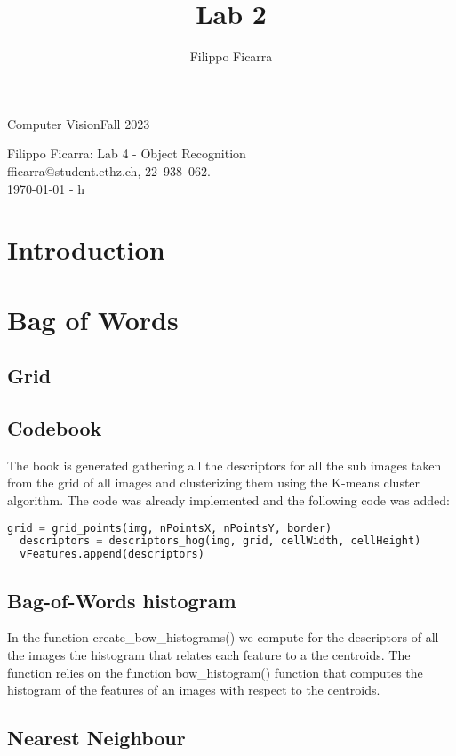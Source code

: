 \documentclass{ETHExercise}
\title{Lab 2}
\author{Filippo Ficarra}
\newcommand{\timestamp}{\ddmmyyyydate\today \,\,- \currenttime h}
\begin{document}
{}
{\Large Computer Vision}{Fall 2023}
\begin{center}
    {\Huge Filippo Ficarra: Lab 4 - Object Recognition}\\
      \quad\newline
      fficarra@student.ethz.ch, 22--938--062.\\
      \quad\newline
      \timestamp
      \end{center}

\section{Introduction}

\section{Bag of Words}
\subsection{Grid}
\subsection{Codebook}
The book is generated gathering all the descriptors for all the sub images 
taken from the grid of all images and clusterizing them using the K-means cluster
algorithm. The code was already implemented and the following code
was added:
\begin{lstlisting}[language=Python, caption=Codebook Generation]
  grid = grid_points(img, nPointsX, nPointsY, border)
  descriptors = descriptors_hog(img, grid, cellWidth, cellHeight)
  vFeatures.append(descriptors)
\end{lstlisting}

\subsection{Bag-of-Words histogram}
In the function create\_bow\_histograms() we compute for the descriptors of all the images 
the histogram that relates each feature to a the centroids. The function
relies on the function bow\_histogram() function that computes the histogram of the features of an images
with respect to the centroids.

\subsection{Nearest Neighbour}
\end{document}
